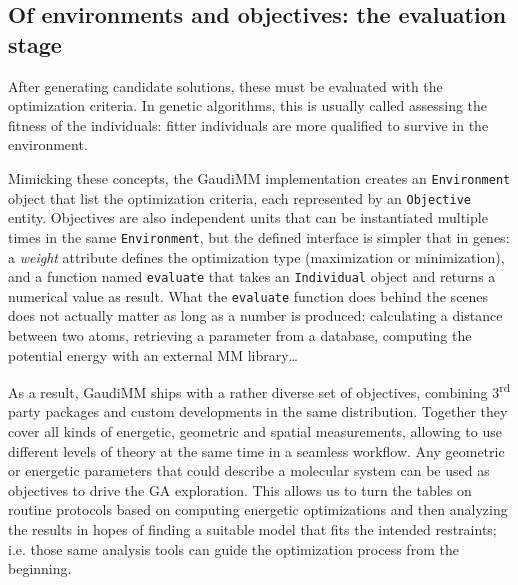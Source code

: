 


\subsection{Of environments and objectives: the evaluation stage}
After generating candidate solutions, these must be evaluated with the optimization criteria. In genetic algorithms, this is usually called assessing the fitness of the individuals: fitter individuals are more qualified to survive in the environment.

Mimicking these concepts, the GaudiMM implementation creates an \texttt{Environment} object that list the optimization criteria, each represented by an \texttt{Objective} entity. Objectives are also independent units that can be instantiated multiple times in the same \texttt{Environment}, but the defined interface is simpler that in genes: a \textit{weight} attribute defines the optimization type (maximization or minimization), and a function named \texttt{evaluate} that takes an \texttt{Individual} object and returns a numerical value as result. What the \texttt{evaluate} function does behind the scenes does not actually matter as long as a number is produced: calculating a distance between two atoms, retrieving a parameter from a database, computing the potential energy with an external MM library\ldots

As a result, GaudiMM ships with a rather diverse set of objectives, combining 3\textsuperscript{rd} party packages and custom developments in the same distribution. Together they cover all kinds of energetic, geometric and spatial measurements, allowing to use different levels of theory at the same time in a seamless workflow. Any geometric or energetic parameters that could describe a molecular system can be used as objectives to drive the GA exploration. This allows us to turn the tables on routine protocols based on computing energetic optimizations and then analyzing the results in hopes of finding a suitable model that fits the intended restraints; i.e. those same analysis tools can guide the optimization process from the beginning.

